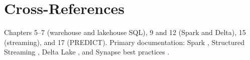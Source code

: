 \section{Cross-References}

Chapters 5--7 (warehouse and lakehouse SQL), 9 and 12 (Spark and Delta), 15
(streaming), and 17 (PREDICT). Primary documentation: Spark \cite{apache2025spark}, Structured
Streaming \cite{apache2025structuredStreaming}, Delta Lake
\cite{armbrust2020delta,deltaio2025delta}, and Synapse best practices
\cite{microsoft2025synapseDedicatedBest,microsoft2025synapseServerless}.
